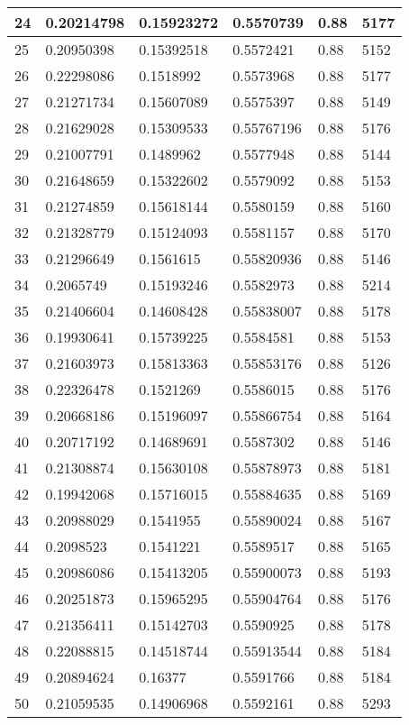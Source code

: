 \begin{longtable}{|l|l|l|l|l|l|}
24 & 0.20214798 & 0.15923272 & 0.5570739 & 0.88 & 5177 \\ \hline 
25 & 0.20950398 & 0.15392518 & 0.5572421 & 0.88 & 5152 \\ \hline 
26 & 0.22298086 & 0.1518992 & 0.5573968 & 0.88 & 5177 \\ \hline 
27 & 0.21271734 & 0.15607089 & 0.5575397 & 0.88 & 5149 \\ \hline 
28 & 0.21629028 & 0.15309533 & 0.55767196 & 0.88 & 5176 \\ \hline 
29 & 0.21007791 & 0.1489962 & 0.5577948 & 0.88 & 5144 \\ \hline 
30 & 0.21648659 & 0.15322602 & 0.5579092 & 0.88 & 5153 \\ \hline 
31 & 0.21274859 & 0.15618144 & 0.5580159 & 0.88 & 5160 \\ \hline 
32 & 0.21328779 & 0.15124093 & 0.5581157 & 0.88 & 5170 \\ \hline 
33 & 0.21296649 & 0.1561615 & 0.55820936 & 0.88 & 5146 \\ \hline 
34 & 0.2065749 & 0.15193246 & 0.5582973 & 0.88 & 5214 \\ \hline 
35 & 0.21406604 & 0.14608428 & 0.55838007 & 0.88 & 5178 \\ \hline 
36 & 0.19930641 & 0.15739225 & 0.5584581 & 0.88 & 5153 \\ \hline 
37 & 0.21603973 & 0.15813363 & 0.55853176 & 0.88 & 5126 \\ \hline 
38 & 0.22326478 & 0.1521269 & 0.5586015 & 0.88 & 5176 \\ \hline 
39 & 0.20668186 & 0.15196097 & 0.55866754 & 0.88 & 5164 \\ \hline 
40 & 0.20717192 & 0.14689691 & 0.5587302 & 0.88 & 5146 \\ \hline 
41 & 0.21308874 & 0.15630108 & 0.55878973 & 0.88 & 5181 \\ \hline 
42 & 0.19942068 & 0.15716015 & 0.55884635 & 0.88 & 5169 \\ \hline 
43 & 0.20988029 & 0.1541955 & 0.55890024 & 0.88 & 5167 \\ \hline 
44 & 0.2098523 & 0.1541221 & 0.5589517 & 0.88 & 5165 \\ \hline 
45 & 0.20986086 & 0.15413205 & 0.55900073 & 0.88 & 5193 \\ \hline 
46 & 0.20251873 & 0.15965295 & 0.55904764 & 0.88 & 5176 \\ \hline 
47 & 0.21356411 & 0.15142703 & 0.5590925 & 0.88 & 5178 \\ \hline 
48 & 0.22088815 & 0.14518744 & 0.55913544 & 0.88 & 5184 \\ \hline 
49 & 0.20894624 & 0.16377 & 0.5591766 & 0.88 & 5184 \\ \hline 
50 & 0.21059535 & 0.14906968 & 0.5592161 & 0.88 & 5293 \\ \hline 
\end{longtable}